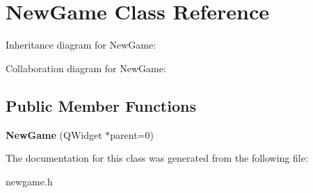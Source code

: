 \hypertarget{class_new_game}{\section{New\+Game Class Reference}
\label{class_new_game}
}


Inheritance diagram for New\+Game\+:


Collaboration diagram for New\+Game\+:
\subsection*{Public Member Functions}
\begin{DoxyCompactItemize}
\item 
\hypertarget{class_new_game_abc0dccbe2a43eef32570473265de9a8a}{{\bfseries New\+Game} (Q\+Widget $\ast$parent=0)}\label{class_new_game_abc0dccbe2a43eef32570473265de9a8a}

\end{DoxyCompactItemize}


The documentation for this class was generated from the following file\+:\begin{DoxyCompactItemize}
\item 
newgame.\+h\end{DoxyCompactItemize}
